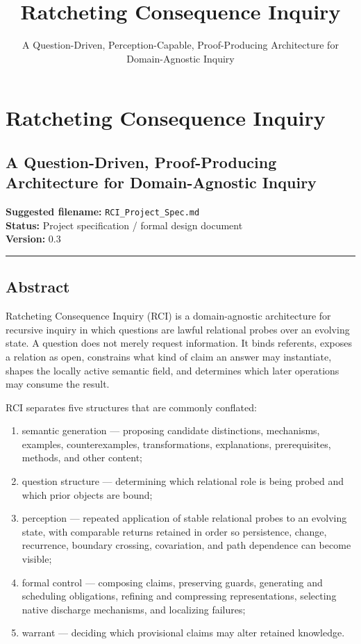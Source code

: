 \documentclass[
]{article}
\title{Ratcheting Consequence Inquiry}
\subtitle{A Question-Driven, Perception-Capable, Proof-Producing Architecture for
Domain-Agnostic Inquiry}
\author{}
\date{}
\providecommand{\tightlist}{%
  \setlength{\itemsep}{0pt}\setlength{\parskip}{0pt}}
\begin{document}
\maketitle

\section{Ratcheting Consequence
Inquiry}\label{ratcheting-consequence-inquiry}

\subsection{A Question-Driven, Proof-Producing Architecture for
Domain-Agnostic
Inquiry}\label{a-question-driven-proof-producing-architecture-for-domain-agnostic-inquiry}

\textbf{Suggested filename:} \texttt{RCI\_Project\_Spec.md}\\
\textbf{Status:} Project specification / formal design document\\
\textbf{Version:} 0.3

\begin{center}\rule{0.5\linewidth}{0.5pt}\end{center}

\subsection{Abstract}\label{abstract}

Ratcheting Consequence Inquiry (RCI) is a domain-agnostic architecture for
recursive inquiry in which questions are lawful relational probes over an
evolving state. A question does not merely request information. It binds
referents, exposes a relation as open, constrains what kind of claim an answer
may instantiate, shapes the locally active semantic field, and determines which
later operations may consume the result.

RCI separates five structures that are commonly conflated:

\begin{enumerate}
\def\labelenumi{\arabic{enumi}.}
\tightlist
\item
  semantic generation --- proposing candidate distinctions, mechanisms,
  examples, counterexamples, transformations, explanations, prerequisites,
  methods, and other content;
\item
  question structure --- determining which relational role is being probed and
  which prior objects are bound;
\item
  perception --- repeated application of stable relational probes to an
  evolving state, with comparable returns retained in order so persistence,
  change, recurrence, boundary crossing, covariation, and path dependence can
  become visible;
\item
  formal control --- composing claims, preserving guards, generating and
  scheduling obligations, refining and compressing representations, selecting
  native discharge mechanisms, and localizing failures;
\item
  warrant --- deciding which provisional claims may alter retained knowledge.
\end{enumerate}
\end{document}
